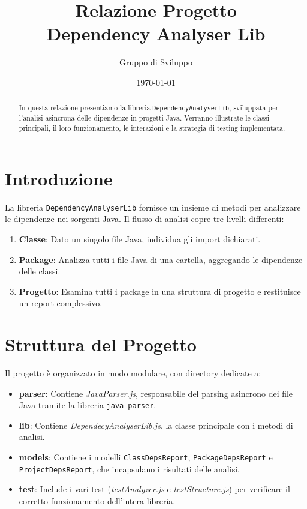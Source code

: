 \documentclass[a4paper,12pt]{article}
\title{Relazione Progetto \\ \large Dependency Analyser Lib}
\author{Gruppo di Sviluppo}
\date{\today}
\begin{document}
\maketitle

\begin{abstract}
In questa relazione presentiamo la libreria \texttt{DependencyAnalyserLib}, sviluppata per l'analisi asincrona delle dipendenze in progetti Java. Verranno illustrate le classi principali, il loro funzionamento, le interazioni e la strategia di testing implementata.
\end{abstract}

\tableofcontents

\section{Introduzione}
La libreria \texttt{DependencyAnalyserLib} fornisce un insieme di metodi per analizzare le dipendenze nei sorgenti Java. Il flusso di analisi copre tre livelli differenti:
\begin{enumerate}
    \item \textbf{Classe}: Dato un singolo file Java, individua gli import dichiarati.
    \item \textbf{Package}: Analizza tutti i file Java di una cartella, aggregando le dipendenze delle classi.
    \item \textbf{Progetto}: Esamina tutti i package in una struttura di progetto e restituisce un report complessivo.
\end{enumerate}

\section{Struttura del Progetto}
Il progetto \`e organizzato in modo modulare, con directory dedicate a:
\begin{itemize}
  \item \textbf{parser}: Contiene \textit{JavaParser.js}, responsabile del parsing asincrono dei file Java tramite la libreria \texttt{java-parser}.
  \item \textbf{lib}: Contiene \textit{DependecyAnalyserLib.js}, la classe principale con i metodi di analisi.
  \item \textbf{models}: Contiene i modelli \texttt{ClassDepsReport}, \texttt{PackageDepsReport} e \texttt{ProjectDepsReport}, che incapsulano i risultati delle analisi.
  \item \textbf{test}: Include i vari test (\textit{testAnalyzer.js} e \textit{testStructure.js}) per verificare il corretto funzionamento dell'intera libreria.
\end{itemize}
\end{document}
